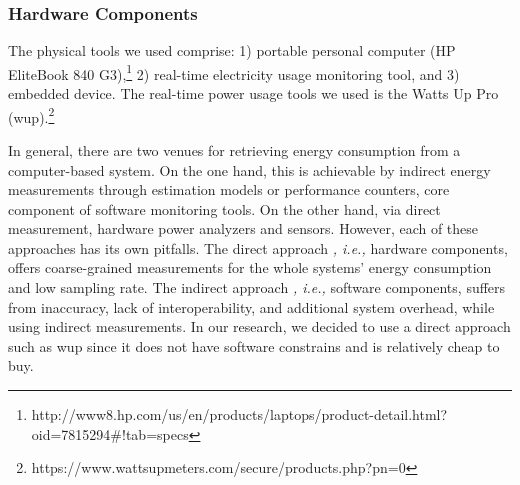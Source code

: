 

\subsubsection{Hardware Components}
The physical tools we used comprise: 1) portable personal 
computer (HP EliteBook 840 G3),\footnote{http://www8.hp.com/us/en/products/laptops/product-detail.html?oid=7815294\#!tab=specs} 
2) real-time electricity usage monitoring tool, and 
3) embedded device.
The real-time power usage tools we used is the Watts Up 
Pro ({\sc wup}).\footnote{https://www.wattsupmeters.com/secure/products.php?pn=0} 

In general, there are two venues for retrieving energy consumption 
from a computer-based system. 
On the one hand, this is achievable by indirect energy measurements 
through estimation models or performance counters, core component 
of software monitoring tools. 
On the other hand, via direct measurement, hardware power analyzers 
and sensors.  
However, each of these approaches has its own pitfalls. The direct approach 
\textit{, i.e.,} hardware components,  offers coarse-grained 
measurements for the whole systems' energy consumption and low sampling 
rate. 
The indirect approach \textit{, i.e.,} software components, suffers 
from inaccuracy, lack of interoperability, and additional system 
overhead, while using indirect measurements. 
In our research, we decided to use a direct approach such as {\sc wup} since it 
does not have software constrains and is relatively cheap to buy.

